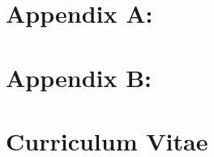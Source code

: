 \documentclass{ulthesis}
\begin{document}




%
%
%
%
%

\printbibliography


\chapter{Appendix A: }

\chapter{Appendix B: }

\chapter{Curriculum Vitae}
%
\end{document}
